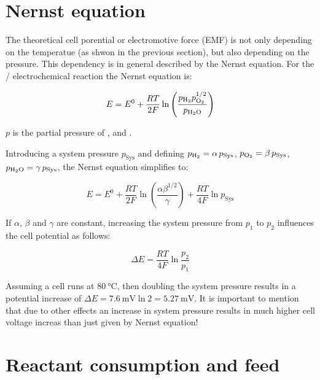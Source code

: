 \documentclass[11pt,a4paper,english,twoside]{scrreprt}
\begin{document}
\section{Nernst equation}

The theoretical cell porential or electromotive force (EMF) is not only depending on the temperatue (as shwon in the previous section), but also depending on the pressure. This dependency is in general described by the Nernst equation. For the / electrochemical reaction the Nernst equation is:

\begin{equation}
	\label{eq:Nernst}
	E = E^{0} + \frac{RT}{2F} \ln \left(\frac{p_{\ce{H2}} p^{1/2}_{\ce{O2}}}{p_{\ce{H2O}}} \right)  
\end{equation}

$p$ is the partial pressure of ,  and .

Introducing a system pressure $p_{\text{Sys}}$ and defining $p_{\ce{H2}} = \alpha\, p_{\text{Sys}}$, $p_{\ce{O2}} = \beta\, p_{\text{Sys}}$, $p_{\ce{H2O}} = \gamma\, p_{\text{Sys}}$, the Nernst equation simplifies to:

\begin{equation}
	\label{eq:Nernst2}
	E = E^{0} + \frac{RT}{2F} \ln \left(\frac{\alpha \beta^{1/2}}{\gamma}\right) + \frac{RT}{4F} \ln p_{\text{Sys}}   
\end{equation}

If $\alpha$, $\beta$ and $\gamma$ are constant, increasing the system pressure from $p_1$ to $p_2$ influences the cell potential as follows:

\begin{equation}
	\label{eq:Nernst3}
	\Delta E = \frac{RT}{4F} \ln \frac{p_2}{p_1}   
\end{equation}

Assuming a cell runs at $\SI{80}{\degreeCelsius}$, then doubling the system pressure results in a potential increase of $\Delta E = \SI{7.6}{\milli\volt} \ln 2 = \SI{5.27}{\milli\volt}$. It is important to mention that due to other effects an increase in system pressure results in much higher cell voltage increas than just given by Nernst equation!




\section{Reactant consumption and feed}
\end{document}
